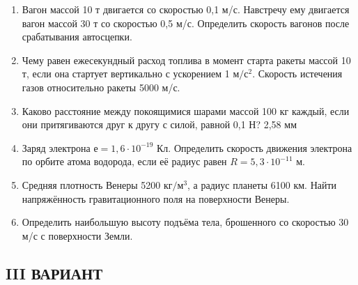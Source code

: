\documentclass[a6paper, 11pt]{diss_4}
\renewcommand{\'}{\,'}
\begin{document}
\begin{enumerate}

\item Вагон  массой 10 т  двигается  со  скоростью  0,1 м/с.  Навстречу ему  двигается вагон массой 30 т  со скоростью 0,5 м/с. Определить скорость вагонов после срабатывания автосцепки.

\item Чему равен ежесекундный расход топлива в момент старта ракеты массой 10 т, если она стартует вертикально с ускорением 1 $м/с^2$. Скорость истечения газов относительно ракеты 5000 м/с.

\item Каково расстояние между покоящимися шарами массой 100 кг каждый, если они притягиваются друг к другу с силой, равной 0,1 Н? 2,58 мм

\item Заряд электрона $е = 1,6\cdot10^{-19}$ Кл. Определить скорость движения электрона по орбите атома водорода, если её радиус равен $R=5,3\cdot10^{-11}$ м.

\item Средняя плотность Венеры 5200 $кг/м^3$, а радиус планеты 6100 км. Найти напряжённость гравитационного поля на поверхности Венеры.

\item Определить наибольшую высоту подъёма тела, брошенного со скоростью 30 м/с с поверхности Земли.

\end{enumerate}

\subsection{III ВАРИАНТ}
\end{document}

